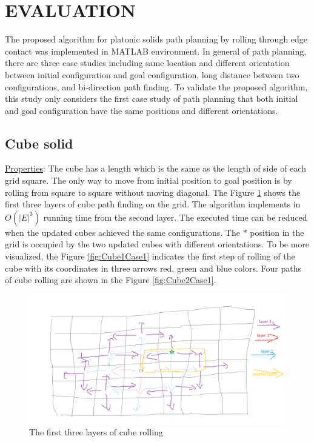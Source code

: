 \section{EVALUATION}

The proposed algorithm for platonic solids path planning by rolling through edge contact was implemented in MATLAB environment. 
In general of path planning, there are three case studies including same location and different orientation between initial configuration and goal configuration, long distance between two configurations, and bi-direction path finding. To validate the proposed algorithm, this study only considers the first case study of path planning that both initial and goal configuration have the same positions and different orientations.\\  

\subsection{Cube solid}
\noindent\uline{Properties}:
The cube has a length which is the same as the length of side of each grid square. The only way to move from initial position to goal position is by rolling from square to square without moving diagonal. The Figure \ref{fig:cubePath0} shows the first three layers of cube path finding on the grid. The algorithm implements in $O(|E|^3)$ running time from the second layer. The executed time can be reduced when the updated cubes achieved the same configurations. The $*$ position in the grid is occupied by the two updated cubes with different orientations. To be more visualized, the Figure \ref{fig:Cube1Case1} indicates the first step of rolling of the cube with its coordinates in three arrows red, green and blue colors. Four paths of cube rolling are shown in the Figure \ref{fig:Cube2Case1}.

\begin{figure}[h]
\centering
	\includegraphics[width=1\textwidth]{image/cubePath0.png}
	\caption{The first three layers of cube rolling}
	\label{fig:cubePath0}
\end{figure}



